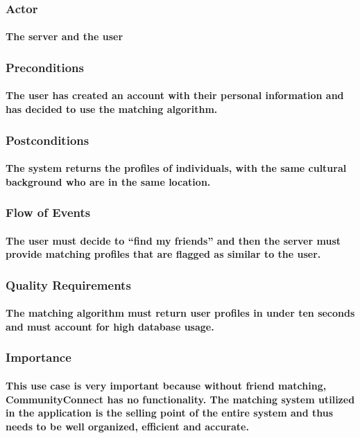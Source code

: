 \documentclass[12pt]{article}
\begin{document}
		\subsubsection{Actor}
			\paragraph{\normalfont The server and the user
			}
		\subsubsection{Preconditions}
			\paragraph{\normalfont The user has created an account with their personal information and has decided to use the matching algorithm.
			}
		\subsubsection{Postconditions}
			\paragraph{\normalfont The system returns the profiles of individuals, with the same cultural background who are in the same location.
			}
		\subsubsection{Flow of Events}
			\paragraph{\normalfont The user must decide to “find my friends” and then the server must provide matching profiles that are flagged as similar to the user.
			}
		\subsubsection{Quality Requirements}
			\paragraph{\normalfont The matching algorithm must return user profiles in under ten seconds and must account for high database usage.
			}
		\subsubsection{Importance}
			\paragraph{\normalfont This use case is very important because without friend matching, CommunityConnect has no functionality. The matching system utilized in the application is the selling point of the entire system and thus needs to be well organized, efficient and accurate.
			}
\end{document}
